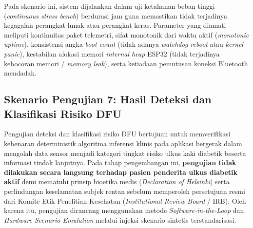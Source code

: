Pada skenario ini, sistem dijalankan dalam uji ketahanan beban tinggi (\textit{continuous stress bench}) berdurasi jam guna memastikan tidak terjadinya kegagalan perangkat lunak atau perangkat keras. Parameter yang diamati meliputi kontinuitas paket telemetri, sifat monotonik dari waktu aktif (\textit{monotonic uptime}), konsistensi angka \textit{boot count} (tidak adanya \textit{watchdog reboot} atau \textit{kernel panic}), kestabilan alokasi memori \textit{internal heap} ESP32 (tidak terjadinya kebocoran memori / \textit{memory leak}), serta ketiadaan pemutusan koneksi Bluetooth mendadak.

\subsection{Skenario Pengujian 7: Hasil Deteksi dan Klasifikasi Risiko DFU}
\label{subsec:Skenario7}

Pengujian deteksi dan klasifikasi risiko DFU bertujuan untuk memverifikasi kebenaran deterministik algoritma inferensi klinis pada aplikasi bergerak dalam mengolah data sensor menjadi kategori tingkat risiko ulkus kaki diabetik beserta informasi tindak lanjutnya. Pada tahap pengembangan ini, \textbf{pengujian tidak dilakukan secara langsung terhadap pasien penderita ulkus diabetik aktif} demi mematuhi prinsip bioetika medis (\textit{Declaration of Helsinki}) serta perlindungan keselamatan subjek rentan sebelum memperoleh persetujuan resmi dari Komite Etik Penelitian Kesehatan (\textit{Institutional Review Board} / IRB). Oleh karena itu, pengujian dirancang menggunakan metode \textit{Software-in-the-Loop} dan \textit{Hardware Scenario Emulation} melalui injeksi skenario sintetis terstandarisasi.

